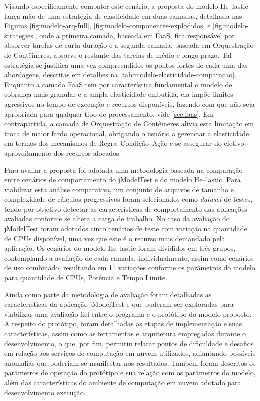 \documentclass[english,brazilian]{UNISINOSmonografia} %
\begin{document}
Visando especificamente combater este cenário, a proposta do modelo \textsf{He}--lastic lança mão de uma estratégia de elasticidade em duas camadas, detalhada nas Figuras \ref{fig:modelo-arq-full}, \ref{fig:modelo-componentes-explodidos} e \ref{fig:modelo-strategies}, onde a primeira camada, baseada em FaaS, fica responsável por absorver tarefas de curta duração e a segunda camada, baseada em Orquestração de Contêineres, absorve o restante das tarefas de médio e longo prazo.
Tal estratégia se justifica uma vez compreendidos os pontos fortes de cada uma das abordagens, descritas em detalhes na \autoref{tab:modelo-elasticidade-comparacao}.
Enquanto a camada FaaS tem por característica fundamental o modelo de cobrança mais granular e a ampla elasticidade embutida, ela impõe limites agressivos no tempo de execução e recursos disponíveis, fazendo com que não seja apropriada para qualquer tipo de processamento, vide \mbox{\autoref{sec:faas}}.
Em contrapartida, a camada de Orquestração de Contêineres alivia esta limitação em troca de maior fardo operacional, obrigando o usuário a gerenciar a elasticidade em termos dos mecanismos de Regra--Condição--Ação e se assegurar do efetivo aproveitamento dos recursos alocados.



Para avaliar a proposta foi adotada uma metodologia baseada na comparação entre cenários de comportamento do jModelTest e do modelo \textsf{He}--lastic.
%
Para viabilizar esta análise comparativa, um conjunto de arquivos de tamanho e complexidade de cálculos progressivos foram selecionados como \textit{dataset} de testes, tendo por objetivo detectar as características de comportamento das aplicações avaliadas conforme se altera a carga de trabalho.
%
No caso da avaliação do jModelTest foram adotados cinco cenários de teste com variação na quantidade de CPUs disponível, uma vez que este é o recurso mais demandado pela aplicação.
%
Os cenários do modelo \textsf{He}--lastic foram divididos em três grupos, contemplando a avaliação de cada camada, individualmente, assim como cenários de uso combinado, resultando em 11 variações conforme os parâmetros do modelo para quantidade de CPUs, Potência e Tempo Limite.



Ainda como parte da metodologia de avaliação foram detalhadas as características da aplicação jModelTest e que puderam ser exploradas para viabilizar uma avaliação fiel entre o programa e o protótipo do modelo proposto.
%
A respeito do protótipo, foram detalhadas as etapas de implementação e suas características, assim como as ferramentas e arquitetura empregadas durante o desenvolvimento, o que, por fim, permitiu relatar pontos de dificuldade e desafios em relação aos serviços de computação em nuvem utilizados, adiantando possíveis anomalias que poderiam se manifestar nos resultados.
%
Também foram descritos os parâmetros de operação do protótipo e sua relação com os parâmetros do modelo, além das características do ambiente de computação em nuvem adotado para desenvolvimento execução.
\end{document}
